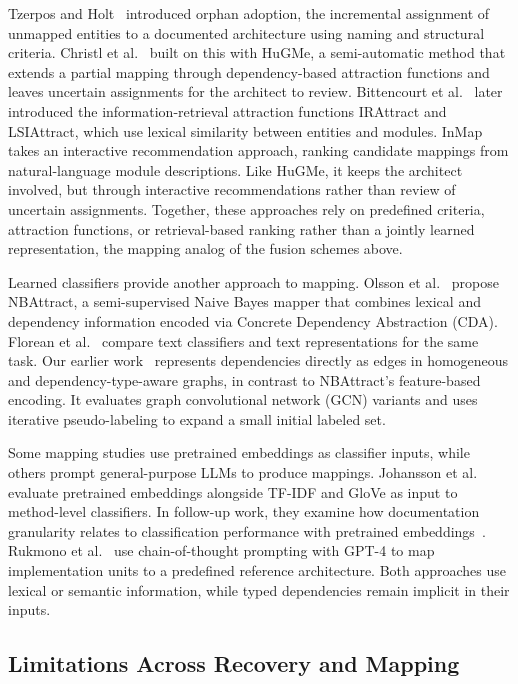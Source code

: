 Tzerpos and Holt~\cite{tzerpos1997orphan} introduced orphan adoption, the incremental assignment of unmapped entities to a documented architecture using naming and structural criteria. Christl et al.~\cite{christl2007automated} built on this with HuGMe, a semi-automatic method that extends a partial mapping through dependency-based attraction functions and leaves uncertain assignments for the architect to review. Bittencourt et al.~\cite{bittencourt_IR} later introduced the information-retrieval attraction functions IRAttract and LSIAttract, which use lexical similarity between entities and modules. InMap~\cite{InMap} takes an interactive recommendation approach, ranking candidate mappings from natural-language module descriptions. Like HuGMe, it keeps the architect involved, but through interactive recommendations rather than review of uncertain assignments. Together, these approaches rely on predefined criteria, attraction functions, or retrieval-based ranking rather than a jointly learned representation, the mapping analog of the fusion schemes above.

Learned classifiers provide another approach to mapping. Olsson et al.~\cite{olsson2022automatically} propose NBAttract, a semi-supervised Naive Bayes mapper that combines lexical and dependency information encoded via Concrete Dependency Abstraction (CDA). Florean et al.~\cite{florean2021textclassifierscomparison} compare text classifiers and text representations for the same task. Our earlier work~\cite{jabeen2025graph} represents dependencies directly as edges in homogeneous and dependency-type-aware graphs, in contrast to NBAttract's feature-based encoding. It evaluates graph convolutional network (GCN) variants and uses iterative pseudo-labeling to expand a small initial labeled set.

Some mapping studies use pretrained embeddings as classifier inputs, while others prompt general-purpose LLMs to produce mappings. Johansson et al.~\cite{johansson2024mapping} evaluate pretrained embeddings alongside TF-IDF and GloVe as input to method-level classifiers. In follow-up work, they examine how documentation granularity relates to classification performance with pretrained embeddings~\cite{johansson2026mapping}. Rukmono et al.~\cite{rukmono2024deductive} use chain-of-thought prompting with GPT-4 to map implementation units to a predefined reference architecture. Both approaches use lexical or semantic information, while typed dependencies remain implicit in their inputs.

\subsection{Limitations Across Recovery and Mapping}

